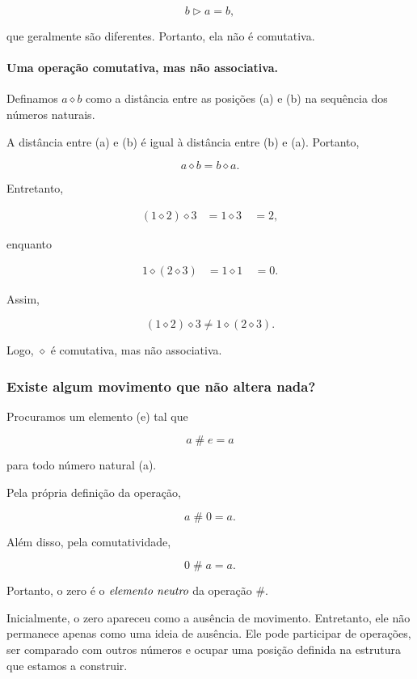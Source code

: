 \documentclass[12pt,a4paper]{article}
\newcommand{\mov}{\mathbin{\#}}
\begin{document}
\[
b\triangleright a=b,
\]

que geralmente são diferentes. Portanto, ela não é comutativa.

\paragraph{Uma operação comutativa, mas não associativa.}

Definamos $a\diamond b$ como a distância entre as posições (a) e
(b) na sequência dos números naturais.

A distância entre (a) e (b) é igual à distância entre (b) e (a).
Portanto,

\[
a\diamond b=b\diamond a.
\]

Entretanto,

\[
\begin{aligned}
(1\diamond2)\diamond3
&=1\diamond3\
&=2,
\end{aligned}
\]

enquanto

\[
\begin{aligned}
1\diamond(2\diamond3)
&=1\diamond1\
&=0.
\end{aligned}
\]

Assim,

\[
(1\diamond2)\diamond3
\neq
1\diamond(2\diamond3).
\]

Logo, $\diamond$ é comutativa, mas não associativa.

\subsubsection{Existe algum movimento que não altera nada?}

Procuramos um elemento (e) tal que

\[
a\mov e=a
\]

para todo número natural (a).

Pela própria definição da operação,

\[
a\mov0=a.
\]

Além disso, pela comutatividade,

\[
0\mov a=a.
\]

Portanto, o zero é o $\emph{elemento neutro}$ da operação $\mov$.

Inicialmente, o zero apareceu como a ausência de movimento. Entretanto,
ele não permanece apenas como uma ideia de ausência. Ele pode participar
de operações, ser comparado com outros números e ocupar uma posição
definida na estrutura que estamos a construir.
\end{document}
